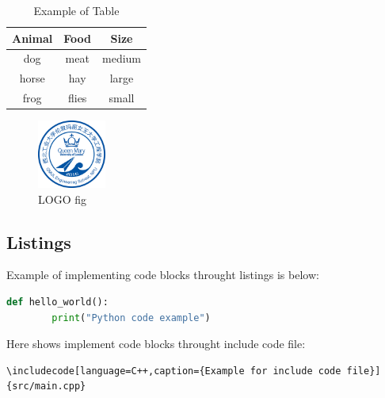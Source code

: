 \documentclass{qmes-template}
\begin{document}

\begin{table}[h!]
    \centering
    \caption{Example of Table} 
    \begin{tabular}{ccc}
        \hline
        Animal & Food  & Size   \\
        \hline
        dog    & meat  & medium \\
        horse  & hay   & large  \\
        frog   & flies & small  \\
        \hline
    \end{tabular}
\end{table}


\begin{figure}[ht]
    \centering
    \includegraphics[width=0.2\textwidth]{./figure/LOGO.jpg}
    \caption{LOGO fig}
\end{figure}

\newpage{}
\subsection{Listings}
Example of implementing code blocks throught listings is below:


\begin{lstlisting}[language=Python,caption={Example Code 2}] 
    def hello_world():
        print("Python code example") 
\end{lstlisting}

Here shows implement code blocks throught include code file:
\begin{lstlisting}[caption={The Implementing of Code Block Below}]
\includecode[language=C++,caption={Example for include code file}]{src/main.cpp}
\end{lstlisting}

\newpage{}
\end{document}

